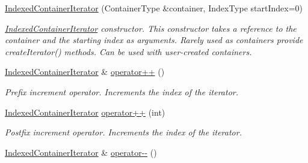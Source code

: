 \begin{DoxyCompactItemize}
\item 
\mbox{\label{class_arcana_1_1_indexed_container_iterator_a032c1a8170b6ed3cb626c460a56ef579}} 
\mbox{\hyperlink{class_arcana_1_1_indexed_container_iterator_a032c1a8170b6ed3cb626c460a56ef579}{Indexed\+Container\+Iterator}} (Container\+Type \&container, Index\+Type start\+Index=0)
\begin{DoxyCompactList}\small\item\em \mbox{\hyperlink{class_arcana_1_1_indexed_container_iterator}{Indexed\+Container\+Iterator}} constructor. This constructor takes a reference to the container and the starting index as arguments. Rarely used as containers provide create\+Iterator() methods. Can be used with user-\/created containers. \end{DoxyCompactList}\item 
\mbox{\label{class_arcana_1_1_indexed_container_iterator_ae38b4d8cace7e619dd4f0c58bda29931}} 
\mbox{\hyperlink{class_arcana_1_1_indexed_container_iterator}{Indexed\+Container\+Iterator}} \& \mbox{\hyperlink{class_arcana_1_1_indexed_container_iterator_ae38b4d8cace7e619dd4f0c58bda29931}{operator++}} ()
\begin{DoxyCompactList}\small\item\em Prefix increment operator. Increments the index of the iterator. \end{DoxyCompactList}\item 
\mbox{\label{class_arcana_1_1_indexed_container_iterator_afcae22817d6746ddb9a1d3686627346d}} 
\mbox{\hyperlink{class_arcana_1_1_indexed_container_iterator}{Indexed\+Container\+Iterator}} \mbox{\hyperlink{class_arcana_1_1_indexed_container_iterator_afcae22817d6746ddb9a1d3686627346d}{operator++}} (int)
\begin{DoxyCompactList}\small\item\em Postfix increment operator. Increments the index of the iterator. \end{DoxyCompactList}\item 
\mbox{\label{class_arcana_1_1_indexed_container_iterator_a5c8c3f653393934e47da75e894ccf0e7}} 
\mbox{\hyperlink{class_arcana_1_1_indexed_container_iterator}{Indexed\+Container\+Iterator}} \& \mbox{\hyperlink{class_arcana_1_1_indexed_container_iterator_a5c8c3f653393934e47da75e894ccf0e7}{operator-\/-\/}} ()

\end{DoxyCompactItemize}
